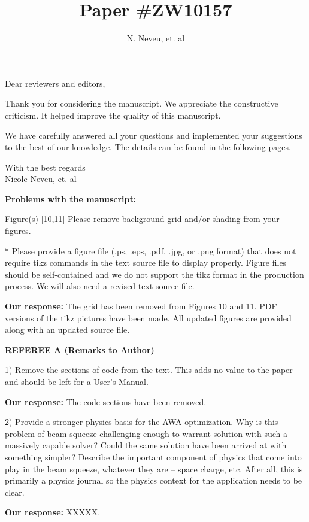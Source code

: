 \documentclass{article}
\begin{document}
\title {Paper  \#ZW10157}
\author {N. Neveu, et. al}

\maketitle
Dear reviewers and editors,

Thank you for considering the manuscript.
We appreciate the constructive criticism. 
It helped improve the quality of this manuscript.

We have carefully answered all your questions and implemented your suggestions to the best of our knowledge.
The details can be found in the following pages.

With the best regards  \\[3mm]
 
Nicole Neveu, et. al

\pagebreak

{\bf Problems with the manuscript:}

{ Figure(s) [10,11] 
	Please remove background grid and/or shading from your figures.

* Please provide a figure file (.ps, .eps, .pdf, .jpg, or .png format)
that does not require tikz commands in the text source file to
display properly. Figure files should be self-contained and we do
not support the tikz format in the production process. We will also
need a revised text source file.}

{\bf Our response:} {\color{blue} The grid has been removed from Figures 10 and 11.
PDF versions of the tikz pictures have been made. All updated figures are provided 
along with an updated source file.}


{\bf REFEREE A (Remarks to Author)}

1) Remove the sections of code from the text. This adds no value to
	the paper and should be left for a User’s Manual.

{\bf Our response:} {\color{blue} The code sections have been removed.}


2) Provide a stronger physics basis for the AWA optimization. Why is
this problem of beam squeeze challenging enough to warrant solution
with such a massively capable solver? Could the same solution have
been arrived at with something simpler? Describe the important
component of physics that come into play in the beam squeeze, whatever
they are – space charge, etc. After all, this is primarily a physics
journal so the physics context for the application needs to be clear.

{\bf Our response:} {\color{blue} XXXXX.}
\end{document}
